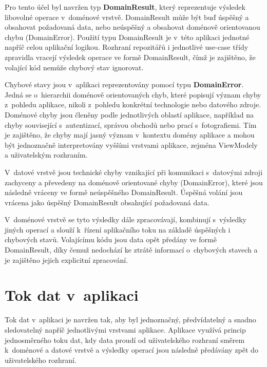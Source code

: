 Pro tento účel byl navržen typ \textbf{DomainResult}, který reprezentuje výsledek libovolné operace v~doménové vrstvě.
DomainResult může být buď úspěšný a obsahovat požadovaná data, nebo neúspěšný a obsahovat doménově orientovanou chybu (DomainError).
Použití typu DomainResult je v~této aplikaci jednotné napříč celou aplikační logikou.
Rozhraní repozitářů i jednotlivé use-case třídy zpravidla vracejí výsledek operace ve formě DomainResult, čímž je zajištěno, že volající kód nemůže chybový stav ignorovat.

Chybové stavy jsou v~aplikaci reprezentovány pomocí typu \textbf{DomainError}.
Jedná se o~hierarchii doménově orientovaných chyb, které popisují význam chyby z~pohledu aplikace, nikoli z~pohledu konkrétní technologie nebo datového zdroje.
Doménové chyby jsou členěny podle jednotlivých oblastí aplikace, například na chyby související s~autentizací, správou obchodů nebo prací s~fotografiemi.
Tím je zajištěno, že chyby mají jasný význam v~kontextu domény aplikace a mohou být jednoznačně interpretovány vyššími vrstvami aplikace, zejména ViewModely a uživatelským rozhraním.

V~datové vrstvě jsou technické chyby vznikající při komunikaci s~datovými zdroji zachyceny a převedeny na doménově orientované chyby (DomainError), které jsou následně vráceny ve formě neúspěšného DomainResult.
Úspěšná volání jsou vrácena jako úspěšný DomainResult obsahující požadovaná data.

V~doménové vrstvě se tyto výsledky dále zpracovávají, kombinují s~výsledky jiných operací a slouží k~řízení aplikačního toku na základě úspěšných i chybových stavů.
Volajícímu kódu jsou data opět předány ve formě DomainResult, díky čemuž nedochází ke ztrátě informací o~chybových stavech a je zajištěno jejich explicitní zpracování.


\section[Tok dat v~aplikaci]{Tok dat v~aplikaci}
Tok dat v~aplikaci je navržen tak, aby byl jednoznačný, předvídatelný a snadno sledovatelný napříč jednotlivými vrstvami aplikace.
Aplikace využívá princip jednosměrného toku dat, kdy data proudí od uživatelského rozhraní směrem k~doménové a datové vrstvě a výsledky operací jsou následně předávány zpět do uživatelského rozhraní.

